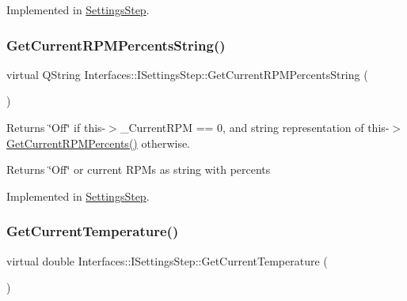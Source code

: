 Implemented in \hyperlink{class_settings_step_a35bea9115637a0c848e8f827f2353c11}{Settings\+Step}.

\mbox{\label{class_interfaces_1_1_i_settings_step_a7575d43b7d178d700e161ec48e2c766f}} 
\subsubsection{\texorpdfstring{Get\+Current\+R\+P\+M\+Percents\+String()}{GetCurrentRPMPercentsString()}}
{\footnotesize\ttfamily virtual Q\+String Interfaces\+::\+I\+Settings\+Step\+::\+Get\+Current\+R\+P\+M\+Percents\+String (\begin{DoxyParamCaption}{ }\end{DoxyParamCaption})\hspace{0.3cm}{\ttfamily [pure virtual]}}



Returns \char`\"{}\+Off\char`\"{} if this-\/$>$\+\_\+\+Current\+R\+PM == 0, and string representation of this-\/$>$\hyperlink{class_interfaces_1_1_i_settings_step_abbbb49e91352212c6201a85f1a22253f}{Get\+Current\+R\+P\+M\+Percents()} otherwise. 

\begin{DoxyReturn}{Returns}
\char`\"{}\+Off\char`\"{} or current R\+P\+Ms as string with percents 
\end{DoxyReturn}


Implemented in \hyperlink{class_settings_step_a21e452401e180d6e114561a8b05ab1ae}{Settings\+Step}.

\mbox{\label{class_interfaces_1_1_i_settings_step_a62644690b7b63d27e72eca277a32bfdd}} 
\subsubsection{\texorpdfstring{Get\+Current\+Temperature()}{GetCurrentTemperature()}}
{\footnotesize\ttfamily virtual double Interfaces\+::\+I\+Settings\+Step\+::\+Get\+Current\+Temperature (\begin{DoxyParamCaption}{ }\end{DoxyParamCaption})\hspace{0.3cm}{\ttfamily [pure virtual]}}



